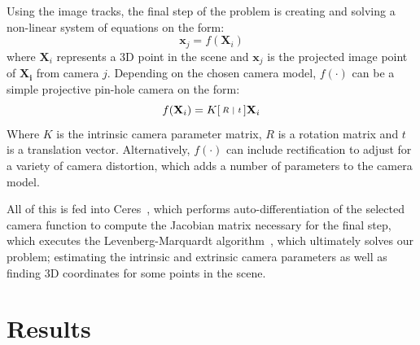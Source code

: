 \documentclass[preprint,acmtog]{acmart}
\begin{document}
Using the image tracks, the final step of the problem is creating and solving a
non-linear system of equations on the form:
%
\begin{equation*}
  \mathbf{x}_{j} = f(\mathbf{X}_{i})
\end{equation*}
%
where $\mathbf{X}_{i}$ represents a 3D point in the scene and $\mathbf{x}_{j}$
is the projected image point of $\mathbf{X_{i}}$ from camera $j$. Depending on
the chosen camera model, $f(\cdot)$ can be a simple projective pin-hole camera on
the form:
%
\begin{equation*}
  f(\mathbf{X}_{i}) =
  K \begin{bsmallmatrix}R & | & t\end{bsmallmatrix} \mathbf{X}_{i}
\end{equation*}
%
Where $K$ is the intrinsic camera parameter matrix, $R$ is a rotation matrix and
$t$ is a translation vector. Alternatively, $f(\cdot)$ can include rectification to
adjust for a variety of camera distortion, which adds a number of parameters to
the camera model.

All of this is fed into Ceres~\cite{ceres-solver}, which performs
auto-differentiation of the selected camera function to compute the Jacobian
matrix necessary for the final step, which executes the Levenberg-Marquardt
algorithm~\cite{More78}, which ultimately solves our problem; estimating the
intrinsic and extrinsic camera parameters as well as finding 3D coordinates for
some points in the scene.


\section{Results}
\end{document}

